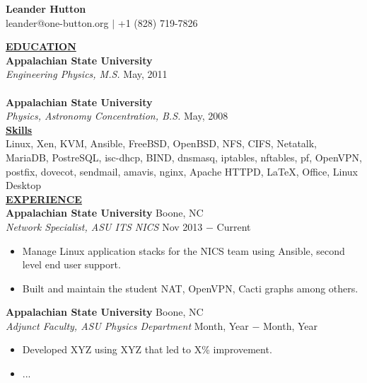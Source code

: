 \documentclass{article}
\begin{document}
\begin{center}
\thispagestyle{empty}
\large \textbf{Leander Hutton \\}
\normalsize leander@one-button.org $\mid$ +1 (828) 719-7826   \\
\hrulefill
\end{center}

\noindent \textbf{\underline{EDUCATION}} \\
\textbf{Appalachian State University} \\
\textit{Engineering Physics, M.S.} \hfill May, 2011 \\ \\
\textbf{Appalachian State University} \\
\textit{Physics, Astronomy Concentration, B.S.} \hfill May, 2008 \\


\noindent \textbf{\underline{Skills}} \\
Linux, Xen, KVM, Ansible, FreeBSD, OpenBSD, NFS, CIFS, Netatalk, MariaDB, PostreSQL, isc-dhcp, BIND, dnsmasq, iptables, nftables, pf, OpenVPN, postfix, dovecot, sendmail, amavis, nginx, Apache HTTPD, \LaTeX, Office, Linux Desktop \\

\noindent \textbf{\underline{EXPERIENCE}} \\
\noindent \textbf{Appalachian State University} \hfill Boone, NC \\
\textit{Network Specialist, ASU ITS NICS} \hfill Nov 2013 $-$ Current
\begin{itemize}[noitemsep,nolistsep,leftmargin=*]
\item {Manage Linux application stacks for the NICS team using Ansible, second level end user support.}
\item {Built and maintain the student NAT, OpenVPN, Cacti graphs among others. \\}
\end{itemize}

\noindent \textbf{Appalachian State University} \hfill Boone, NC \\
\textit{Adjunct Faculty, ASU Physics Department} \hfill Month, Year $-$ Month, Year
\begin{itemize}[noitemsep,nolistsep,leftmargin=*]
\item {Developed XYZ using XYZ that led to X\% improvement.}
\item {... \\}
\end{itemize}
\end{document}
